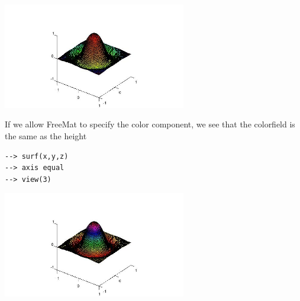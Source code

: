 \centerline{\includegraphics[width=8cm]{surf1}}

If we allow FreeMat to specify the color component, we see that
the colorfield is the same as the height
\begin{verbatim}
--> surf(x,y,z)
--> axis equal
--> view(3)
\end{verbatim}


\centerline{\includegraphics[width=8cm]{surf2}}


